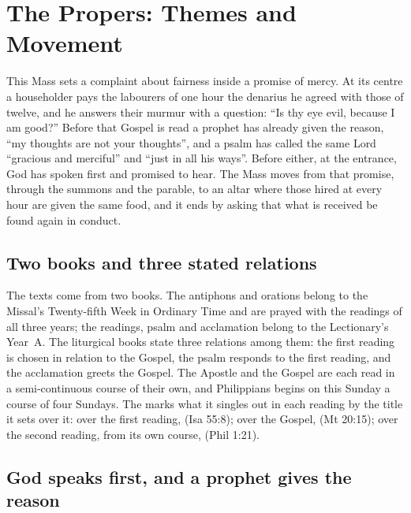 
\section{The Propers: Themes and Movement}

This Mass sets a complaint about fairness inside a promise of mercy. At its
centre a householder pays the labourers of one hour the denarius he agreed
with those of twelve, and he answers their murmur with a question: ``Is thy eye evil, because I am good?'' Before
that Gospel is read a prophet has already given the reason, ``my thoughts are
not your thoughts'', and a psalm has called the same Lord ``gracious and
merciful'' and ``just in all his ways''. Before either, at the entrance, God
has spoken first and promised to hear. The Mass moves from that promise,
through the summons and the parable, to an altar where those hired at every
hour are given the same food, and it ends by asking that what is received be
found again in conduct.

\subsection{Two books and three stated relations}

The texts come from two books. The antiphons and orations belong to the
Missal's Twenty-fifth Week in Ordinary Time and are prayed with the readings
of all three years; the readings, psalm and acclamation belong to the
Lectionary's Year~A. The liturgical books state
three relations among them: the first reading is chosen in relation to the
Gospel, the psalm responds to the first reading, and the acclamation greets the
Gospel. The Apostle and the Gospel are each read in a semi-continuous course
of their own, and Philippians begins on this Sunday a course of four Sundays.
The  marks what it singles out in each reading by
the title it sets over it: over the first reading,  (Isa 55:8); over the Gospel,  (Mt 20:15); over the second reading, from its
own course,  (Phil 1:21).

\subsection{God speaks first, and a prophet gives the reason}

